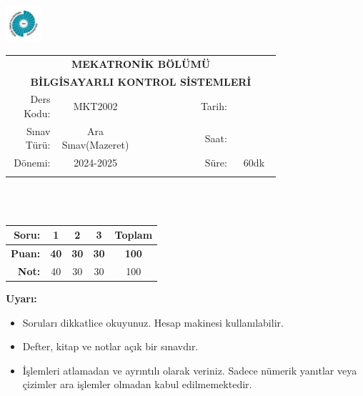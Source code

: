 \newcommand\UniversiteAdi{Niğde Ömer Halisdemir Üniversitesi}
\newcommand\BolumAdi{MEKATRONİK BÖLÜMÜ}
\newcommand\DersKodu{MKT2002}
\newcommand\DersAdi{BİLGİSAYARLI KONTROL SİSTEMLERİ}
\newcommand\SinavAdi{Ara Sınav(Mazeret)}
\newcommand\SinavTarihi{ }
\newcommand\SinavSaati{ }
\newcommand\SinavSuresi{60dk}

\pagestyle{fancy}
\fancyhf{} %
\noindent \includegraphics[width=0.1\textwidth]{logo}
\begin{tabular}{
    p{0.15\linewidth}
    p{0.15\linewidth}
    p{0.2\linewidth}
    p{0.1\linewidth}
    p{0.15\linewidth}}
    \multicolumn{5}{c}{\textbf{\BolumAdi}}\\
    \multicolumn{5}{c}{\textbf{\DersAdi}}\\\hline
    \multicolumn{1}{|r|}{Ders Kodu:}&
    \multicolumn{1}{|c|}{\DersKodu}&
    \multicolumn{1}{|c|}{}& 
    \multicolumn{1}{|r|}{Tarih:}&
    \multicolumn{1}{|c|}{\SinavTarihi} \\\hline
    \multicolumn{1}{|r|}{Sınav Türü:}&
    \multicolumn{1}{|c|}{\SinavAdi}&  
    \multicolumn{1}{|c|}{}&
    \multicolumn{1}{|r|}{Saat:}&
    \multicolumn{1}{|c|}{\SinavSaati}\\\hline
    \multicolumn{1}{|r|}{Dönemi:}&
    \multicolumn{1}{|c|}{2024-2025}&
    \multicolumn{1}{|c|}{}&
    \multicolumn{1}{|r|}{Süre:}&
    \multicolumn{1}{|c|}{\SinavSuresi} \\\hline
    &&&&\\
\end{tabular}\\\\
\noindent\begin{center}
\begin{tabular}{|r|c|c|c|c|}\hline
    \textbf{Soru:}&
    \textbf{1}&
    \textbf{2}&
    \textbf{3}&
    \textbf{Toplam}\\\hline
    \textbf{Puan:}&
    \textbf{40}&
    \textbf{30}&
    \textbf{30}&
    \textbf{100}\\\hline
    \textbf{Not:}&40&30&30&100\\\hline
\end{tabular}\end{center}
\noindent\textbf{Uyarı:}
\begin{itemize}\bfseries
    \item Soruları dikkatlice okuyunuz. Hesap makinesi kullanılabilir.
    \item Defter, kitap ve notlar açık bir sınavdır.
    \item İşlemleri atlamadan ve ayrıntılı olarak veriniz. Sadece nümerik yanıtlar veya çizimler ara işlemler olmadan kabul edilmemektedir.
\end{itemize}


